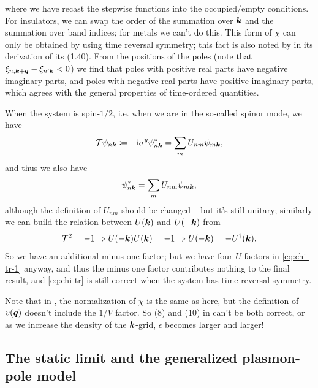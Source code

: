 \documentclass[hyperref, a4paper, 12pt]{report}
\newcommand*{\ii}{\mathrm{i}}
\begin{document}
where we have recast the stepwise functions into 
the occupied/empty conditions. 
For insulators, we can swap the order of the summation over $\vb*{k}$ 
and the summation over band indices; 
for metals we can't do this. 
This form of $\chi$ can only be obtained by using time reversal symmetry; 
this fact is also noted by \cite{spataru2004electron} in its derivation of its (1.40).
From the positions of the poles (note that $\xi_{n, \vb*{k} + \vb*{q}} - \xi_{n' \vb*{k}} < 0$) 
we find that poles with positive real parts have negative imaginary parts, 
and poles with negative real parts have positive imaginary parts, 
which agrees with the general properties 
of time-ordered quantities. 

When the system is spin-$1/2$, i.e. when we are in the so-called spinor mode, 
we have 
\begin{equation}
    \mathcal{T} \psi_{n \vb*{k}} \coloneqq - \ii \sigma^y \psi^*_{n \vb*{k}}
    = \sum_{m } U_{nm} \psi_{m \vb*{k}},
\end{equation}
and thus we also have 
\begin{equation}
    \psi^*_{n \vb*{k}} = \sum_{m } U_{nm} \psi_{m \vb*{k}},
\end{equation}
although the definition of $U_{nm}$ should be changed -- 
but it's still unitary; 
similarly we can build the relation between $U(\vb*{k})$ and $U(- \vb*{k})$ from 
\begin{equation}
    \mathcal{T}^2 = - 1 \Rightarrow U(- \vb*{k}) U(\vb*{k}) = -1 
    \Rightarrow U(- \vb*{k}) = - U^\dagger(\vb*{k}).
\end{equation}
So we have an additional minus one factor; 
but we have four $U$ factors in \eqref{eq:chi-tr-1} anyway, 
and thus the minus one factor contributes nothing to the final result, 
and \eqref{eq:chi-tr} is still correct 
when the system has time reversal symmetry. 

Note that in \cite{berkeleygw},
the normalization of $\chi$ is the same as here,
but the definition of $v(\vb*{q})$ doesn't include the $1/V$ factor.
So (8) and (10) in \cite{berkeleygw} can't be both correct, 
or as we increase the density of the $\vb*{k}$-grid,
$\epsilon$ becomes larger and larger!

\subsection{The static limit and the generalized plasmon-pole model}\label{sec:gw-bse.epsilon.gpp}
\end{document}
